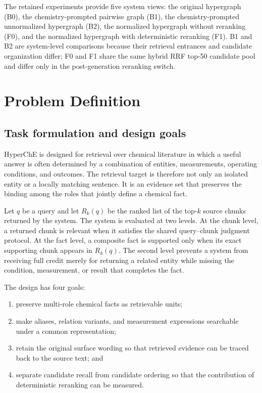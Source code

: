 The retained experiments provide five system views: the original hypergraph (B0), the chemistry-prompted pairwise graph (B1), the chemistry-prompted unnormalized hypergraph (B2), the normalized hypergraph without reranking (F0), and the normalized hypergraph with deterministic reranking (F1). B1 and B2 are system-level comparisons because their retrieval entrances and candidate organization differ; F0 and F1 share the same hybrid RRF top-50 candidate pool and differ only in the post-generation reranking switch.

\section{Problem Definition}

\subsection{Task formulation and design goals}

HyperChE is designed for retrieval over chemical literature in which a useful answer is often determined by a combination of entities, measurements, operating conditions, and outcomes. The retrieval target is therefore not only an isolated entity or a locally matching sentence. It is an evidence set that preserves the binding among the roles that jointly define a chemical fact.

Let $q$ be a query and let $R_k(q)$ be the ranked list of the top-$k$ source chunks returned by the system. The system is evaluated at two levels. At the chunk level, a returned chunk is relevant when it satisfies the shared query--chunk judgment protocol. At the fact level, a composite fact is supported only when its exact supporting chunk appears in $R_k(q)$. The second level prevents a system from receiving full credit merely for returning a related entity while missing the condition, measurement, or result that completes the fact.

The design has four goals:

\begin{enumerate}
\item preserve multi-role chemical facts as retrievable units;
\item make aliases, relation variants, and measurement expressions searchable under a common representation;
\item retain the original surface wording so that retrieved evidence can be traced back to the source text; and
\item separate candidate recall from candidate ordering so that the contribution of deterministic reranking can be measured.
\end{enumerate}

